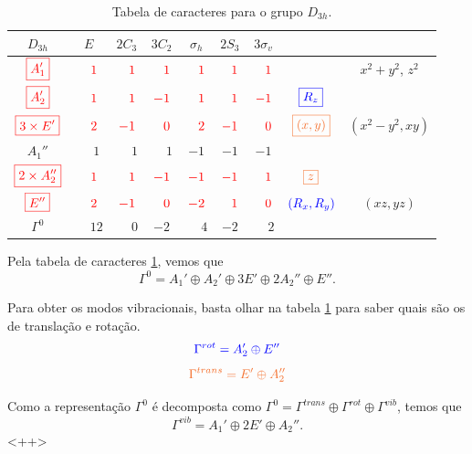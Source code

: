 \documentclass[a4paper,10pt]{article}
\renewcommand{\p}{\phantom{+}}
\renewcommand{\c}[1]{\textcolor{red}{#1}}
\begin{document}
\begin{table}[H]
\caption{Tabela de caracteres para o grupo $D_{3h}$.}
\centering
\begin{tabular} { |c|c c c c c c | c | c | }
\hline
$D_{3h}$ & $E$ & $2 C_{3}$ & $3 C_{2}$ & $\sigma_h$ & $2 S_3$ & $3 \sigma_v$ & & \\
\hline
$\c{\boxed{A_1'}}$  & $\c{\p1}$ & $\c{\p1}$ & $\c{\p1}$ & $\c{\p1}$ & $\c{\p1}$ & $\c{\p1}$ & & $x^2+y^2$, $z^2$ \\
$\c{\boxed{A_2'}}$  & $\c{\p1}$ & $\c{\p1}$ & $\c{ -1}$ & $\c{\p1}$ & $\c{\p1}$ & $\c{ -1}$ & $\textcolor{blue}{\boxed{R_z}}$ &  \\
$\c{\boxed{3\times E'}}$    & $\c{\p2}$ & $\c{ -1}$ & $\c{\p0}$ & $\c{\p2}$ & $\c{ -1}$ & $\c{\p0}$ & $\textcolor{Orange}{\boxed{(x,y)}}$ & $(x^2-y^2, xy)$ \\
$A_1''$ & $\p1$ & $\p1$ & $\p1$ & $ -1$ & $ -1$ & $ -1$ & & \\
$\c{\boxed{2\times A_2''}}$ & $\c{\p1}$ & $\c{\p1}$ & $\c{ -1}$ & $\c{ -1}$ & $\c{ -1}$ & $\c{\p1}$ & $\textcolor{Orange}{\boxed{z}}$ & \\
$\c{\boxed{E''}}$   & $\c{\p2}$ & $\c{ -1}$ & $\c{\p0}$ & $\c{ -2}$ & $\c{\p1}$ & $\c{\p0}$ & $\textcolor{blue}{(R_x,R_y)}$ & $(xz,yz)$ \\
\hline
\hline
$\Gamma^0$ & $\p12$ & $\p0$ & $ -2$ & $\p4$ & $ -2$ & $\p2$ \\
\hline
\end{tabular}
\label{tab:D3h}
\end{table}

Pela tabela de caracteres \ref{tab:D3h}, vemos que
$$
\boxed{ \Gamma^0 = A_1' \oplus A_2' \oplus 3E' \oplus 2A_2'' \oplus E''. }
$$

Para obter os modos vibracionais, basta olhar na tabela \ref{tab:D3h} para saber quais são os de translação e rotação.
$$
\textcolor{blue}{\Gamma^{rot} = A_2' \oplus E''}
$$
$$
\textcolor{Orange}{\Gamma^{trans} = E' \oplus A_2''}
$$

Como a representação $\Gamma^0$ é decomposta como $\Gamma^0 = \Gamma^{trans} \oplus \Gamma^{rot} \oplus \Gamma^{vib}$, temos que
$$
\boxed{\Gamma^{vib} = A_1' \oplus 2 E' \oplus A_2''.}
$$
<++>
\end{document}
